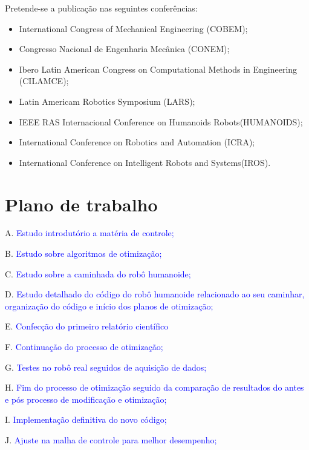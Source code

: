 Pretende-se a publicação nas seguintes conferências:
\begin{itemize}
   \item International Congress of Mechanical Engineering (COBEM);
   \item Congresso Nacional de Engenharia Mecânica (CONEM);

\item Ibero Latin American Congress on Computational Methods in Engineering (CILAMCE);

\item Latin Americam Robotics Symposium (LARS);

\item IEEE RAS Internacional Conference on Humanoids Robots(HUMANOIDS);

\item International Conference on Robotics and Automation (ICRA);

\item International Conference on Intelligent Robots and Systems(IROS).
 \end{itemize}


\section{Plano de trabalho}

A.	\textcolor{blue}{Estudo introdutório a matéria de controle;}

B.	\textcolor{blue}{Estudo sobre algoritmos de otimização;}

C.	\textcolor{blue}{Estudo sobre a caminhada do robô humanoide;}

D.	\textcolor{blue}{Estudo detalhado do código do robô humanoide relacionado ao seu caminhar, organização do código e início dos planos de otimização;}

E.	\textcolor{blue}{Confecção do primeiro relatório científico}

F.	\textcolor{blue}{Continuação do processo de otimização;}

G.	\textcolor{blue}{Testes no robô real seguidos de aquisição de dados;}

H.	\textcolor{blue}{Fim do processo de otimização seguido da comparação de resultados do antes e pós processo de modificação e otimização;}

I.	\textcolor{blue}{Implementação definitiva do novo código;}

J.	\textcolor{blue}{Ajuste na malha de controle para melhor desempenho;}

